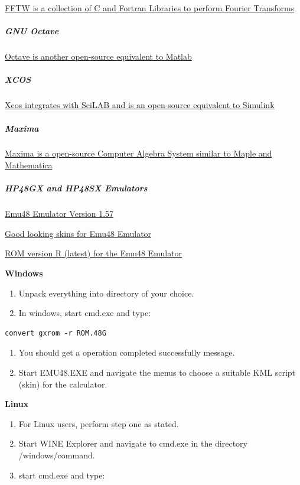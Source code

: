 \href{http://www.fftw.org}{FFTW is a collection of C and Fortran Libraries to perform Fourier Transforms}

\subparagraph{GNU Octave}

\href{http://www.gnu.org/software/octave}{Octave is another open-source equivalent to Matlab}

\subparagraph{XCOS}

\href{https://www.scilab.org/software/xcos}{Xcos integrates with SciLAB and is an open-source equivalent to Simulink}

\subparagraph{Maxima}

\href{http://maxima.sourceforge.net}{Maxima is a open-source Computer Algebra System similar to Maple and Mathematica}

\subparagraph{HP48GX and HP48SX Emulators}

\href{http://www.hpcalc.org/details.php?id=3644}{Emu48 Emulator Version 1.57} \newline

\href{http://www.hpcalc.org/details.php?id=6571}{Good looking skins for Emu48 Emulator} \newline

\href{http://www.hpcalc.org/details.php?id=4368}{ROM version R (latest) for the Emu48 Emulator}\newline

\textbf{Windows}

\begin{enumerate}
\item Unpack everything into directory of your choice.
\item In windows, start cmd.exe and type:
\end{enumerate}

\begin{verbatim}
convert gxrom -r ROM.48G
\end{verbatim}

\begin{enumerate}[resume]
\item You should get a operation completed successfully message.
\item Start EMU48.EXE and navigate the menus to choose a suitable KML script (skin) for the calculator. \newline
\end{enumerate}

\textbf{Linux}

\begin{enumerate}
\item For Linux users, perform step one as stated.
\item Start WINE Explorer and navigate to cmd.exe in the directory /windows/command.
\item start cmd.exe and type:
\end{enumerate}

